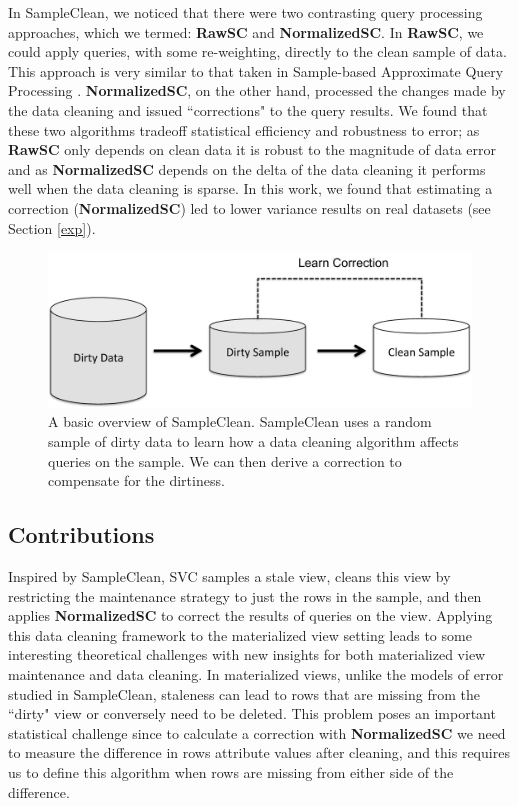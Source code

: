 In SampleClean, we noticed that there were two contrasting query processing approaches, which we termed: \textbf{RawSC} and \textbf{NormalizedSC}.
In \textbf{RawSC}, we could apply queries, with some re-weighting, directly to the clean sample of data.
This approach is very similar to that taken in Sample-based Approximate Query Processing \cite{OlkenR86,AgarwalMPMMS13, joshi2008materialized}.
\textbf{NormalizedSC}, on the other hand, processed the changes made by the data cleaning and issued ``corrections" to the query results.
We found that these two algorithms tradeoff statistical efficiency and robustness to error; as \textbf{RawSC} only depends on clean data it is robust to the magnitude of data error and as \textbf{NormalizedSC} depends on the delta of the data cleaning it performs well when the data cleaning is sparse. 
In this work, we found that estimating a correction (\textbf{NormalizedSC}) led to lower variance results on real datasets (see Section \ref{exp}). 

\begin{figure}[t] \vspace{-2em}
\centering
 \includegraphics[scale=0.30]{figs/sys-arch2.pdf} \vspace{-.25em}
 \caption{A basic overview of SampleClean. SampleClean uses a random sample of dirty data to learn how a data cleaning algorithm affects queries on the sample. We can then derive a correction to compensate for the dirtiness. \label{sc}}\vspace{-1.75em}
\end{figure}

\subsection{Contributions}
Inspired by SampleClean, SVC samples a stale view, cleans this view by restricting the maintenance strategy to just the rows in the sample, and then applies \textbf{NormalizedSC} to correct the results of queries on the view.
Applying this data cleaning framework to the materialized view setting leads to some interesting theoretical challenges with new insights for both materialized view maintenance and data cleaning.
In materialized views, unlike the models of error studied in SampleClean, staleness can lead to rows that are missing from the ``dirty" view or conversely need to be deleted.
This problem poses an important statistical challenge since to calculate a correction with \textbf{NormalizedSC} we need to measure the difference in rows attribute values after cleaning, and this requires us to define this algorithm when rows are missing from either side of the difference.

